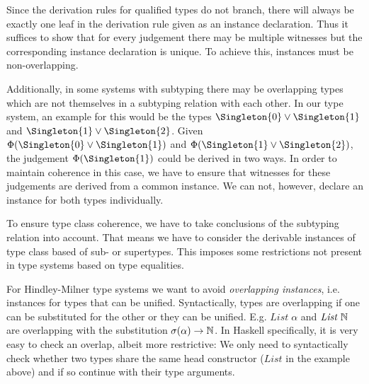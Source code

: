 Since the derivation rules for qualified types do not branch, there will always be exactly one leaf in the derivation rule given as an instance declaration.
Thus it suffices to show that for every judgement there  may be multiple witnesses but the corresponding instance declaration is unique.
To achieve this, instances must be non-overlapping.

Additionally, in some systems with subtyping there may be overlapping types which are not themselves in a subtyping relation with each other.
In our type system, an example for this would be the types $\Singleton{0} \join \Singleton{1}$ and $\Singleton{1} \join \Singleton{2}$.
Given $\Phi(\Singleton{0} \join \Singleton{1})$ and $\Phi(\Singleton{1} \join \Singleton{2})$, the judgement $\Phi(\Singleton{1})$ could be derived in two ways.
In order to maintain coherence in this case, we have to ensure that witnesses for these judgements are derived from a common instance.
We can not, however, declare an instance for both types individually.

To ensure type class coherence, we have to take conclusions of the subtyping relation into account.
That means we have to consider the derivable instances of type class based of sub- or supertypes.
This imposes some restrictions not present in type systems based on type equalities.

For Hindley-Milner type systems we want to avoid \emph{overlapping instances}, i.e. instances for types that can be unified. \cite{peytonjones1997type}
Syntactically, types are overlapping if one can be substituted for the other or they can be unified.
E.g. $\mathit{List} \; \alpha$ and $\mathit{List} \; \mathbb{N}$ are overlapping with the substitution $\sigma(\alpha) \to \mathbb{N}$.
In Haskell specifically, it is very easy to check an overlap, albeit more restrictive: We only need to syntactically check whether two types share the same head constructor ($\mathit{List}$ in the example above) and if so continue with their type arguments.



